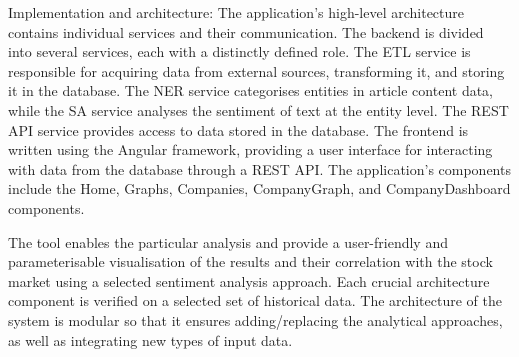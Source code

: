 Implementation and architecture:
The application's high-level architecture contains individual services and their communication. The backend is divided into several services, each with a distinctly defined role. The ETL service is responsible for acquiring data from external sources, transforming it, and storing it in the database. The NER service categorises entities in article content data, while the SA service analyses the sentiment of text at the entity level. The REST API service provides access to data stored in the database. The frontend is written using the Angular framework, providing a user interface for interacting with data from the database through a REST API. The application's components include the Home, Graphs, Companies, CompanyGraph, and CompanyDashboard components.

The tool enables the particular analysis and provide a user-friendly and parameterisable visualisation of the results and their correlation with the stock market using a selected sentiment analysis approach. Each crucial architecture component is verified on a selected set of historical data. The architecture of the system is modular so that it ensures adding/replacing the analytical approaches, as well as integrating new types of input data.